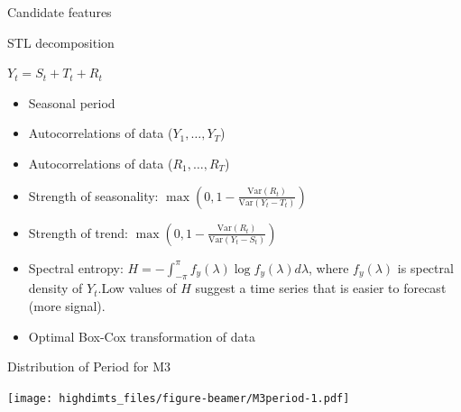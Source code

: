 \documentclass[14pt,ignorenonframetext,]{beamer}
\providecommand{\tightlist}{%
  \setlength{\itemsep}{0pt}\setlength{\parskip}{0pt}}
\def\Var{\text{Var}}
\def\Var{\text{Var}}
\begin{document}
\begin{frame}{Candidate features}
\protect\hypertarget{candidate-features}{}

\begin{block}{STL decomposition}
\centerline{$Y_t = S_t + T_t + R_t$}
\end{block}\pause\fontsize{14}{16}\sf\vspace*{-0.2cm}

\begin{itemize}
\tightlist
\item
  Seasonal period
\item
  Autocorrelations of data (\(Y_1,\dots,Y_T\))
\item
  Autocorrelations of data (\(R_1,\dots,R_T\))
\item
  Strength of seasonality:
  \(\max\left(0,1 - \frac{\Var(R_t)}{\Var(Y_t-T_t)}\right)\)
\item
  Strength of trend:
  \(\max\left(0,1 - \frac{\Var(R_t)}{\Var(Y_t-S_t)}\right)\)
\item
  Spectral entropy:
  \(H = - \int_{-\pi}^{\pi} f_y(\lambda) \log f_y(\lambda) d\lambda\),
  where \(f_y(\lambda)\) is spectral density of \(Y_t\).\newline Low
  values of \(H\) suggest a time series that is easier to forecast (more
  signal).
\item
  Optimal Box-Cox transformation of data
\end{itemize}

\fontsize{9}{10}\sf

\end{frame}

\begin{frame}{Distribution of Period for M3}
\protect\hypertarget{distribution-of-period-for-m3}{}

\texttt{[image: highdimts\_files/figure-beamer/M3period-1.pdf]}

\end{frame}
\end{document}
